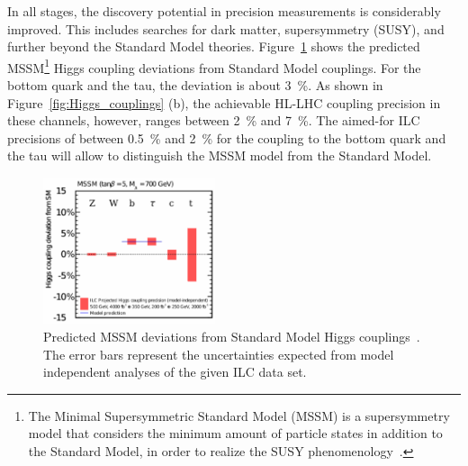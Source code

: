 In all stages, the discovery potential in precision measurements is considerably improved.
This includes searches for dark matter, supersymmetry (SUSY), and further beyond the Standard Model theories.
Figure~\ref{fig:MSSM_higgs_coupling} shows the predicted MSSM\footnote{The Minimal Supersymmetric Standard Model (MSSM) is a supersymmetry model that considers the minimum amount of particle states in addition to the Standard Model, in order to realize the SUSY phenomenology~\cite{MSSM}.} Higgs coupling deviations from Standard Model couplings.
For the bottom quark and the tau, the deviation is about \SI{3}{\percent}.
As shown in Figure~\ref{fig:Higgs_couplings} (b), the achievable HL-LHC coupling precision in these channels, however, ranges between \SI{2}{\percent} and \SI{7}{\percent}.
The aimed-for ILC precisions of between \SI{0.5}{\percent} and \SI{2}{\percent} for the coupling to the bottom quark and the tau will allow to distinguish the MSSM model from the Standard Model.
\begin{figure}
\centering
\includegraphics[width=0.45\textwidth]{Figures/MSSM_higgs_coupling.pdf}
\caption[Predicted MSSM deviations from SM Higgs couplings]{Predicted MSSM deviations from Standard Model Higgs couplings~\cite[p. 12]{ILCPhysics}.
The error bars represent the uncertainties expected from model independent analyses of the given ILC data set.}
\label{fig:MSSM_higgs_coupling}
\end{figure}

